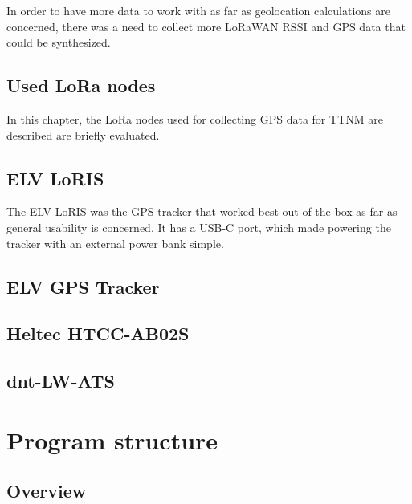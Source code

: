 In order to have more data to work with as far as geolocation calculations are concerned, there was a need to collect more \ac{LoRaWAN} \ac{RSSI} and \ac{GPS} data that could be synthesized.

\subsection{Used \ac{LoRa} nodes}

In this chapter, the \ac{LoRa} nodes used for collecting \ac{GPS} data for \ac{TTNM} are described are briefly evaluated.

\subsection{ELV LoRIS}


The ELV LoRIS was the \ac{GPS} tracker that worked best out of the box as far as general usability is concerned.
It has a USB-C port, which made powering the tracker with an external power bank simple.


\subsection{ELV \ac{GPS} Tracker}


\subsection{Heltec HTCC-AB02S}


\subsection{dnt-LW-ATS}


\section{Program structure}

\subsection{Overview}


